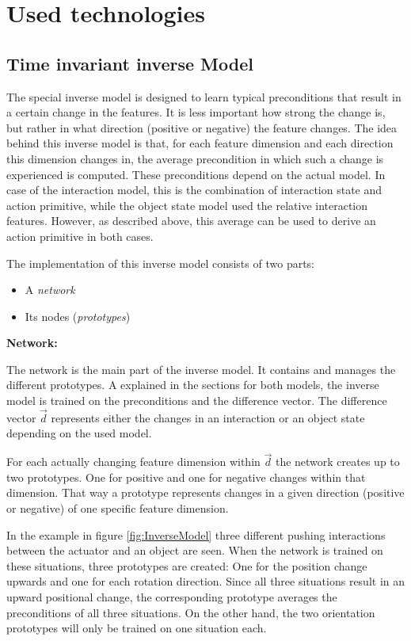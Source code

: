 \section{Used technologies \label{sec:technologies}}

\subsection{Time invariant inverse Model \label{sec:invModelRealization}} %

The special inverse model is designed to learn typical preconditions that result in a certain change in the features. It is less important how strong the change is, but rather in what direction (positive or negative) the feature changes. The idea behind this inverse model is that, for each feature dimension and each direction this dimension changes in, the average precondition in which such a change is experienced is computed. 
These preconditions depend on the actual model. In case of the interaction model, this is the combination of interaction state and action primitive, while the object state model used the relative interaction features. However, as described above, this average can be used to derive an action primitive in both cases.

The implementation of this inverse model consists of two parts: 
\begin{itemize}
\item A \textit{network}
\item Its nodes (\textit{prototypes})
\end{itemize}

\textbf{Network:}

The network is the main part of the inverse model. It contains and manages the different prototypes. 
A explained in the sections for both models, the inverse model is trained on the preconditions and the difference vector. The difference vector $\vec{d}$ represents either the changes in an interaction or an object state depending on the used model.

For each actually changing feature dimension within $\vec{d}$ the network creates up to two prototypes. One for positive and one for negative changes within that dimension. That way a prototype represents changes in a given direction (positive or negative) of one specific feature dimension. 

In the example in figure \ref{fig:InverseModel} three different pushing interactions between the actuator and an object are seen. 
When the network is trained on these situations, three prototypes are created: One for the position change upwards and one for each rotation direction. 
Since all three situations result in an upward positional change, the corresponding prototype averages the preconditions of all three situations.
On the other hand, the two orientation prototypes will only be trained on one situation each.

